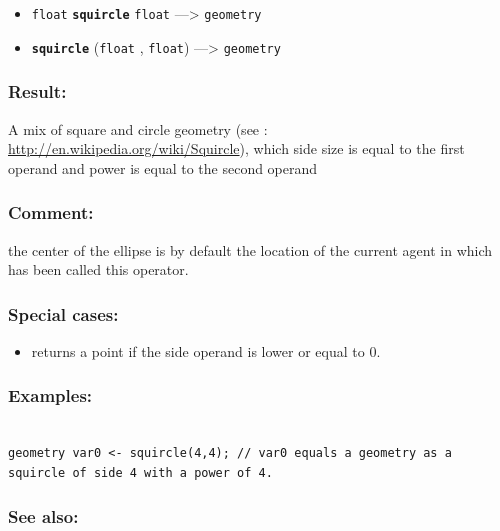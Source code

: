 \documentclass[]{book}
\providecommand{\tightlist}{%
  \setlength{\itemsep}{0pt}\setlength{\parskip}{0pt}}
\theoremstyle{definition}
\theoremstyle{definition}
\theoremstyle{definition}
\theoremstyle{remark}
\begin{document}
\begin{itemize}
\tightlist
\item
  \texttt{float} \textbf{\texttt{squircle}} \texttt{float}
  ---\textgreater{} \texttt{geometry}
\item
  \textbf{\texttt{squircle}} (\texttt{float} , \texttt{float})
  ---\textgreater{} \texttt{geometry}
\end{itemize}

\subsubsection{Result:}\label{result-484}

A mix of square and circle geometry (see :
\url{http://en.wikipedia.org/wiki/Squircle}), which side size is equal
to the first operand and power is equal to the second operand

\subsubsection{Comment:}\label{comment-93}

the center of the ellipse is by default the location of the current
agent in which has been called this operator.

\subsubsection{Special cases:}\label{special-cases-131}

\begin{itemize}
\tightlist
\item
  returns a point if the side operand is lower or equal to 0.
\end{itemize}

\subsubsection{Examples:}\label{examples-349}

\begin{verbatim}
 
geometry var0 <- squircle(4,4); // var0 equals a geometry as a squircle of side 4 with a power of 4.
\end{verbatim}

\subsubsection{See also:}\label{see-also-196}
\end{document}
